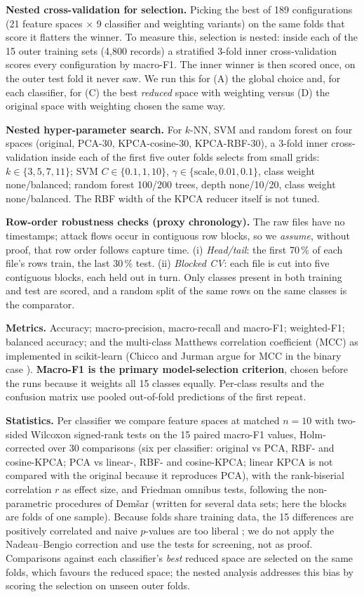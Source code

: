 \documentclass[runningheads]{llncs}
\begin{document}
\textbf{Nested cross-validation for selection.} Picking the best of 189 configurations (21 feature spaces $\times$ 9 classifier and weighting variants) on the same folds that score it flatters the winner. To measure this, selection is nested: inside each of the 15 outer training sets (4{,}800 records) a stratified 3-fold inner cross-validation scores every configuration by macro-F1. The inner winner is then scored once, on the outer test fold it never saw. We run this for (A) the global choice and, for each classifier, for (C) the best \emph{reduced} space with weighting versus (D) the original space with weighting chosen the same way.

\textbf{Nested hyper-parameter search.} For $k$-NN, SVM and random forest on four spaces (original, PCA-30, KPCA-cosine-30, KPCA-RBF-30), a 3-fold inner cross-validation inside each of the first five outer folds selects from small grids: $k\in\{3,5,7,11\}$; SVM $C\in\{0.1,1,10\}$, $\gamma\in\{\text{scale},0.01,0.1\}$, class weight none/balanced; random forest 100/200 trees, depth none/10/20, class weight none/balanced. The RBF width of the KPCA reducer itself is not tuned.

\textbf{Row-order robustness checks (proxy chronology).} The raw files have no timestamps; attack flows occur in contiguous row blocks, so we \emph{assume}, without proof, that row order follows capture time. (i) \emph{Head/tail}: the first 70\,\% of each file's rows train, the last 30\,\% test. (ii) \emph{Blocked CV}: each file is cut into five contiguous blocks, each held out in turn. Only classes present in both training and test are scored, and a random split of the same rows on the same classes is the comparator.

\textbf{Metrics.} Accuracy; macro-precision, macro-recall and macro-F1; weighted-F1; balanced accuracy; and the multi-class Matthews correlation coefficient (MCC) as implemented in scikit-learn (Chicco and Jurman argue for MCC in the binary case \cite{chicco2020}). \textbf{Macro-F1 is the primary model-selection criterion}, chosen before the runs because it weights all 15 classes equally. Per-class results and the confusion matrix use pooled out-of-fold predictions of the first repeat.

\textbf{Statistics.} Per classifier we compare feature spaces at matched $n=10$ with two-sided Wilcoxon signed-rank tests on the 15 paired macro-F1 values, Holm-corrected over 30 comparisons (six per classifier: original vs PCA, RBF- and cosine-KPCA; PCA vs linear-, RBF- and cosine-KPCA; linear KPCA is not compared with the original because it reproduces PCA), with the rank-biserial correlation $r$ as effect size, and Friedman omnibus tests, following the non-parametric procedures of Dem\v{s}ar \cite{demsar2006} (written for several data sets; here the blocks are folds of one sample). Because folds share training data, the 15 differences are positively correlated and naive $p$-values are too liberal \cite{nadeau2003}; we do not apply the Nadeau--Bengio correction and use the tests for screening, not as proof. Comparisons against each classifier's \emph{best} reduced space are selected on the same folds, which favours the reduced space; the nested analysis addresses this bias by scoring the selection on unseen outer folds.
\end{document}
